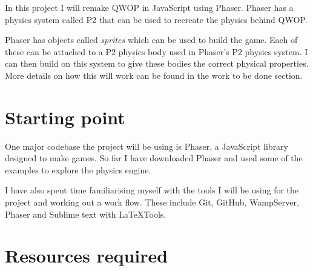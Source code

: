 \documentclass[12pt,a4paper,twoside]{article}
\begin{document}

In this project I will remake QWOP in JavaScript using Phaser. Phaser has a physics system called P2 that can be used to recreate the physics behind QWOP.

Phaser has objects called \emph{sprites} which can be used to build the game. Each of these can be attached to a P2 physics body used in Phaser's P2 physics system. I can then build on this system to give these bodies the correct physical properties.
More details on how this will work can be found in the work to be done section.


 

\section*{Starting point}


One major codebase the project will be using is Phaser, a JavaScript library designed to make games.
So far I have downloaded Phaser and used some of the examples to explore the physics engine.

I have also spent time familiarising myself with the tools I will be using for the project and working out a work flow. These include Git, GitHub, WampServer, Phaser and Sublime text with LaTeXTools.

\section*{Resources required}
\end{document}
